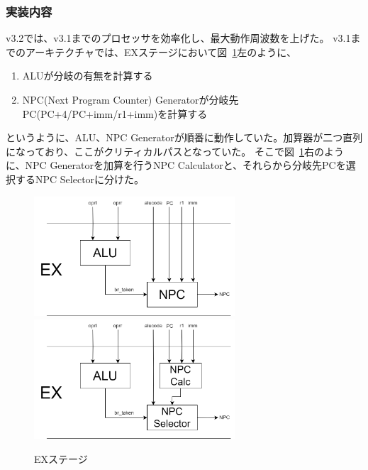 \documentclass[dvipdfmx,10pt,a4paper,titlepage]{jsarticle}
\begin{document}
    \subsubsection{実装内容}
    v3.2では、v3.1までのプロセッサを効率化し、最大動作周波数を上げた。
    v3.1までのアーキテクチャでは、EXステージにおいて図~\ref{fig:NPC}左のように、
    \begin{enumerate}
        \item ALUが分岐の有無を計算する
        \item NPC(Next Program Counter) Generatorが分岐先PC(PC+4/PC+imm/r1+imm)を計算する
    \end{enumerate}
    というように、ALU、NPC Generatorが順番に動作していた。加算器が二つ直列になっており、ここがクリティカルパスとなっていた。
    そこで図~\ref{fig:NPC}右のように、NPC Generatorを加算を行うNPC Calculatorと、それらから分岐先PCを選択するNPC Selectorに分けた。
    \begin{figure}
        \centering
        \includegraphics[width=7.5cm]{figure/NPC1.png}
        \includegraphics[width=7.5cm]{figure/NPC2.png}
        \caption{EXステージ}\label{fig:NPC}
    \end{figure}
\end{document}
